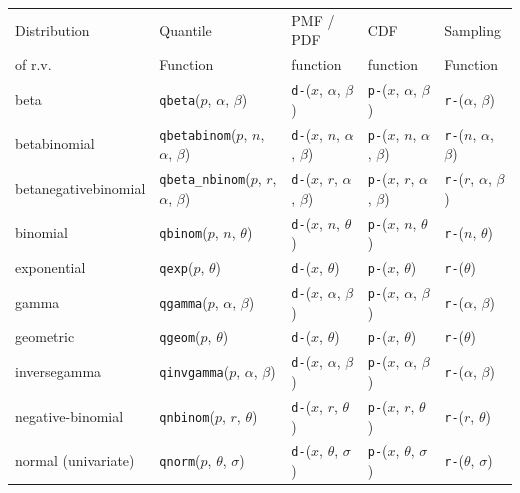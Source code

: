 \documentclass[12pt]{article}
\begin{document}
\begin{table}[htp]
\centering
\small
\begin{tabular}{l | llll}
Distribution                  & Quantile  & PMF / PDF  &CDF       & Sampling  \\ 
of r.v. &  Function & function         & function &  Function \\ \hline
beta & \texttt{qbeta}($p$, $\alpha$, $\beta$)             
& \texttt{d-}($x$, $\alpha$, $\beta$)
& \texttt{p-}($x$, $\alpha$, $\beta$) 
& \texttt{r-}($\alpha$, $\beta$) \\
betabinomial & \texttt{qbetabinom}($p$, $n$, $\alpha$, $\beta$)              
& \texttt{d-}($x$, $n$, $\alpha$, $\beta$)
& \texttt{p-}($x$, $n$, $\alpha$, $\beta$) 
& \texttt{r-}($n$, $\alpha$, $\beta$) \\

betanegativebinomial & \texttt{qbeta\_nbinom}($p$, $r$, $\alpha$, $\beta$) 
& \texttt{d-}($x$, $r$, $\alpha$, $\beta$)
& \texttt{p-}($x$, $r$, $\alpha$, $\beta$) 
& \texttt{r-}($r$, $\alpha$, $\beta$) \\

binomial & \texttt{qbinom}($p$, $n$, $\theta$) 
& \texttt{d-}($x$, $n$, $\theta$)
& \texttt{p-}($x$, $n$, $\theta$) 
& \texttt{r-}($n$, $\theta$) \\

exponential & \texttt{qexp}($p$, $\theta$) 
& \texttt{d-}($x$, $\theta$) 
& \texttt{p-}($x$, $\theta$) 
& \texttt{r-}($\theta$) \\

gamma & \texttt{qgamma}($p$, $\alpha$, $\beta$) 
& \texttt{d-}($x$, $\alpha$, $\beta$)
& \texttt{p-}($x$, $\alpha$, $\beta$) 
& \texttt{r-}($\alpha$, $\beta$) \\

geometric & \texttt{qgeom}($p$, $\theta$) 
& \texttt{d-}($x$, $\theta$)
& \texttt{p-}($x$, $\theta$) 
& \texttt{r-}($\theta$) \\

inversegamma & \texttt{qinvgamma}($p$, $\alpha$, $\beta$) 
& \texttt{d-}($x$, $\alpha$, $\beta$)
& \texttt{p-}($x$, $\alpha$, $\beta$) 
& \texttt{r-}($\alpha$, $\beta$) \\

negative-binomial & \texttt{qnbinom}($p$, $r$, $\theta$) 
& \texttt{d-}($x$, $r$, $\theta$) 
& \texttt{p-}($x$, $r$, $\theta$) 
& \texttt{r-}($r$, $\theta$) \\

normal (univariate) & \texttt{qnorm}($p$, $\theta$, $\sigma$) 
& \texttt{d-}($x$, $\theta$, $\sigma$)
& \texttt{p-}($x$, $\theta$, $\sigma$) 
& \texttt{r-}($\theta$, $\sigma$) \\


\end{tabular}
\end{table}
\end{document}
